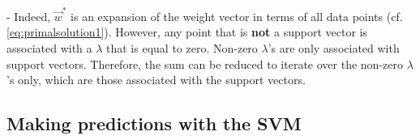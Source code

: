 \begin{frame}

- Indeed, $\vec w^{*}$ is an expansion of the weight vector in terms of all data points (cf. \eqref{eq:primalsolution1}). However, any point that is \textbf{not} a support vector is associated with a $\lambda$ that is equal to zero. Non-zero $\lambda$'s are only associated with support vectors. Therefore, the sum can be reduced to iterate over the non-zero $\lambda$'s only, which are those associated with the support vectors.

\end{frame}

\subsection{Making predictions with the SVM}

